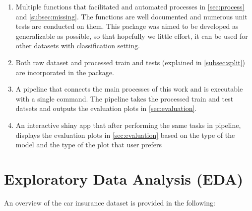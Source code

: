 \documentclass{article}
\begin{document}
\begin{enumerate}
\def\labelenumi{\arabic{enumi}.}
\item
  Multiple functions that facilitated and automated processes in
  \ref{sec:process} and \ref{subsec:missing}. The functions are well
  documented and numerous unit tests are conducted on them. This package
  was aimed to be developed as generalizable as possible, so that
  hopefully we little effort, it can be used for other datasets with
  classification setting.
\item
  Both raw dataset and processed train and tests (explained in
  \ref{subsec:split}) are incorporated in the package.
\item
  A pipeline that connects the main processes of this work and is
  executable with a single command. The pipeline takes the processed
  train and test datsets and outputs the evaluation plots in
  \ref{sec:evaluation}.
\item
  An interactive shiny app that after performing the same tasks in
  pipeline, displays the evaluation plots in \ref{sec:evaluation} based
  on the type of the model and the type of the plot that user prefers
\end{enumerate}

\hypertarget{exploratory-data-analysis-eda}{%
\section{\texorpdfstring{Exploratory Data Analysis (EDA)
\label{sec:data}}{Exploratory Data Analysis (EDA) }}\label{exploratory-data-analysis-eda}}

An overview of the car insurance dataset is provided in the following:
\tiny
\end{document}
